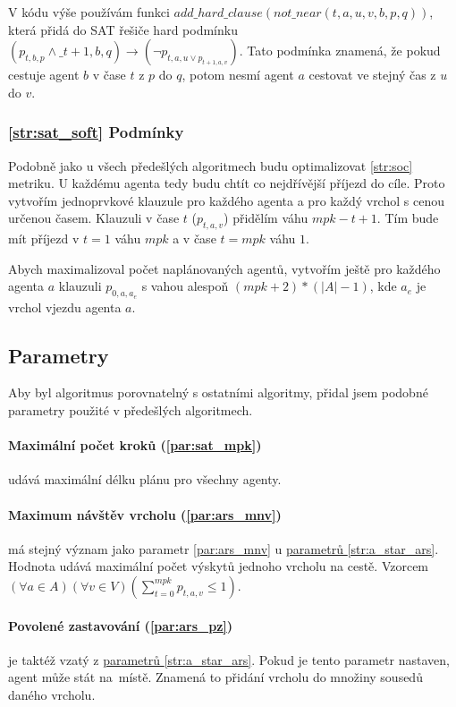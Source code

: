 V kódu výše používám funkci $add\_hard\_clause(not\_near(t, a, u, v, b, p, q))$,
která přidá do SAT řešiče hard podmínku $(p_{t,b,p} \wedge \_{t+1,b,q}) \rightarrow (\neg p_{t,a,u \vee p_{t+1,a,v}})$.
Tato podmínka znamená, že pokud cestuje agent $b$ v čase $t$ z $p$ do $q$,
potom nesmí agent $a$ cestovat ve stejný čas z $u$ do $v$.

\subsubsection{\ref{str:sat_soft} Podmínky}\label{subsubsec:sat_soft_podminky}

Podobně jako u všech předešlých algoritmech budu optimalizovat \ref{str:soc} metriku.
U každému agenta tedy budu chtít co nejdřívější příjezd do cíle.
Proto vytvořím jednoprvkové klauzule pro každého agenta a pro každý vrchol s cenou určenou časem.
Klauzuli v čase $t$ ($p_{t, a, v}$) přidělím váhu $mpk - t + 1$.
Tím bude mít příjezd v $t = 1$ váhu $mpk$ a v čase $t = mpk$ váhu $1$.

Abych maximalizoval počet naplánovaných agentů, vytvořím ještě pro každého agenta $a$
klauzuli $p_{0, a, a_e}$ s vahou alespoň $(mpk + 2) * (|A| - 1)$, kde $a_e$ je vrchol vjezdu agenta $a$.

\subsection{Parametry}\label{subsec:sat_parametry}

Aby byl algoritmus porovnatelný s ostatními algoritmy, přidal jsem podobné parametry použité v předešlých algoritmech.

\paragraph{Maximální počet kroků (\ref{par:sat_mpk})}
udává maximální délku plánu pro všechny agenty.

\paragraph{Maximum návštěv vrcholu (\ref{par:ars_mnv})} má stejný význam jako
parametr \ref{par:ars_mnv} u \hyperref[subsubsec:ars_parametry]{parametrů \ref{str:a_star_ars}}.
Hodnota udává maximální počet výskytů jednoho vrcholu na cestě.
Vzorcem $(\forall a \in A)(\forall v \in V)(\sum_{t=0}^{mpk} p_{t, a, v} \leq 1)$.

\paragraph{Povolené zastavování (\ref{par:ars_pz})}\label{par:sat_povolene_zastavovani} je taktéž vzatý
z \hyperref[subsubsec:ars_parametry]{parametrů \ref{str:a_star_ars}}.
Pokud je tento parametr nastaven, agent může stát na~místě.
Znamená to přidání vrcholu do množiny sousedů daného vrcholu.

